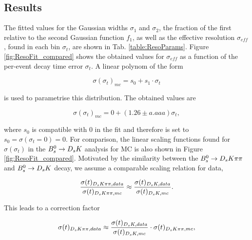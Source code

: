 \subsection{Results}

The fitted values for the Gaussian widths $\sigma_{1}$ and $\sigma_{2}$, 
the fraction of the first relative to the second Gaussian function $f_{1}$, as well as the effective resolution $\sigma_{eff}$, found in each bin $\sigma_{t}$, are shown in Tab. \ref{table:ResoParams}.
Figure \ref{fig:ResoFit_compared} shows the obtained values for $\sigma_{eff}$ as a function of the per-event decay time error $\sigma_{t}$. A linear polynom of the form  

\begin{equation}
\sigma(\sigma_{t})_{mc} = s_{0} + s_{1}\cdot \sigma_{t} 
\label{eq:resfit}
\end{equation}

is used to parametrise this distribution. The obtained values are 

\begin{equation}
\sigma(\sigma_{t})_{mc} = 0 + (1.26 \pm a.aaa) \sigma_{t},
\label{eq:resfitres}
\end{equation}

where $s_{0}$ is compatible with 0 in the fit and therefore is set to $s_{0} = \sigma(\sigma_{t} = 0) = 0$. 
For comparison, the linear scaling functions found for $\sigma(\sigma_{t})$ in the ${{B}^0_{s}}\rightarrow{\ensuremath{{D}_{s}}}{\ensuremath{K}}$ analysis \cite{Aaij:2017lff} for MC is also shown in Figure \ref{fig:ResoFit_compared}.  
Motivated by the similarity between the ${{B}^0_{s}}\rightarrow{\ensuremath{{D}_{s}}}{\ensuremath{K}}{\ensuremath{\pi}}{\ensuremath{\pi}}$ and ${{B}^0_{s}}\rightarrow{\ensuremath{{D}_{s}}}{\ensuremath{K}}$ decay, we assume a comparable scaling relation for data, 

\begin{equation}
\frac{\sigma(t)_{{{D}_{s}}{K}{\pi}{\pi},data}}{\sigma(t)_{{{D}_{s}}{K}{\pi}{\pi},mc}} \approx  \frac{\sigma(t)_{{{D}_{s}}{K},data}}{\sigma(t)_{{{D}_{s}}{K},mc}}.
\label{eq:resoMCvsData}
\end{equation}

This leads to a correction factor 

\begin{equation}
\sigma(t)_{{{D}_{s}}{K}{\pi}{\pi},data} \approx  \frac{\sigma(t)_{{{D}_{s}}{K},data}}{\sigma(t)_{{{D}_{s}}{K},mc}} \cdot \sigma(t)_{{{D}_{s}}{K}{\pi}{\pi},mc},
\label{eq:resoMCvsData_2}
\end{equation}

